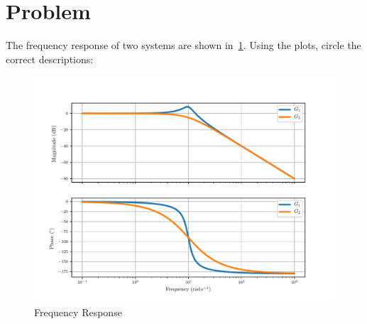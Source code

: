 \documentclass[titlepage, 11pt, reqno]{article}    %
\begin{document}
\begin{figure}[htbp]
\centering
\begin{scaletikzpicturetowidth}{0.95\textwidth}
\end{scaletikzpicturetowidth}
\end{figure}

\newpage
\thispagestyle{plain}
\mbox{}

\newpage
\section{Problem}\label{prob:bode_response_analysis}

The frequency response of two systems are shown in~\cref{fig:prob1_bode}.
Using the plots, circle the correct descriptions:
\the\textwidth
\begin{figure}[htbp]
    \centering
    \includegraphics[width=\textwidth, height=0.6\textheight, keepaspectratio]{figures/prob1_bode.pdf}
    \caption{Frequency Response~\label{fig:prob1_bode}}
\end{figure}  
\end{document}

